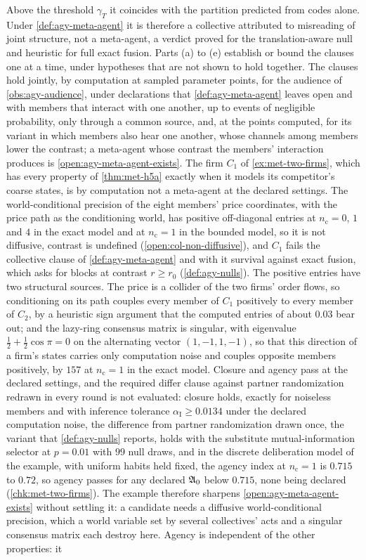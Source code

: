 \begin{remark}
Above the threshold $\gamma_T$ it coincides with the partition predicted from codes alone. Under \cref{def:agy-meta-agent} it is therefore a collective attributed to misreading of joint structure, not a meta-agent, a verdict proved for the translation-aware null and heuristic for full exact fusion. Parts (a) to (e) establish or bound the clauses one at a time, under hypotheses that are not shown to hold together. The clauses hold jointly, by computation at sampled parameter points, for the audience of \cref{obs:agy-audience}, under declarations that \cref{def:agy-meta-agent} leaves open and with members that interact with one another, up to events of negligible probability, only through a common source, and, at the points computed, for its variant in which members also hear one another, whose channels among members lower the contrast; a meta-agent whose contrast the members' interaction produces is \cref{open:agy-meta-agent-exists}. The firm $C_1$ of \cref{ex:met-two-firms}, which has every property of \cref{thm:met-h5a} exactly when it models its competitor's coarse states, is by computation not a meta-agent at the declared settings. The world-conditional precision of the eight members' price coordinates, with the price path as the conditioning world, has positive off-diagonal entries at $n_{\mathrm c}=0$, $1$ and $4$ in the exact model and at $n_{\mathrm c}=1$ in the bounded model, so it is not diffusive, contrast is undefined (\cref{open:col-non-diffusive}), and $C_1$ fails the collective clause of \cref{def:agy-meta-agent} and with it survival against exact fusion, which asks for blocks at contrast $r\ge r_0$ (\cref{def:agy-nulls}). The positive entries have two structural sources. The price is a collider of the two firms' order flows, so conditioning on its path couples every member of $C_1$ positively to every member of $C_2$, by a heuristic sign argument that the computed entries of about $0.03$ bear out; and the lazy-ring consensus matrix is singular, with eigenvalue $\frac12+\frac12\cos\pi=0$ on the alternating vector $(1,-1,1,-1)$, so that this direction of a firm's states carries only computation noise and couples opposite members positively, by $157$ at $n_{\mathrm c}=1$ in the exact model. Closure and agency pass at the declared settings, and the required differ clause against partner randomization redrawn in every round is not evaluated: closure holds, exactly for noiseless members and with inference tolerance $\alpha_{\mathrm I}\ge0.0134$ under the declared computation noise, the difference from partner randomization drawn once, the variant that \cref{def:agy-nulls} reports, holds with the substitute mutual-information selector at $p=0.01$ with $99$ null draws, and in the discrete deliberation model of the example, with uniform habits held fixed, the agency index at $n_{\mathrm c}=1$ is $0.715$ to $0.72$, so agency passes for any declared $\mathfrak{A}_0$ below $0.715$, none being declared (\cref{chk:met-two-firms}). The example therefore sharpens \cref{open:agy-meta-agent-exists} without settling it: a candidate needs a diffusive world-conditional precision, which a world variable set by several collectives' acts and a singular consensus matrix each destroy here. Agency is independent of the other properties: it 
\end{remark}
